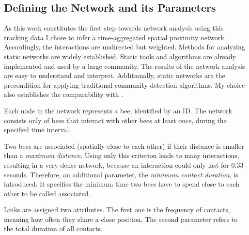 \subsection{Defining the Network and its Parameters}
As this work constitutes the first step towards network analysis using this tracking data I chose to infer a time-aggregated spatial proximity network.
Accordingly, the interactions are undirected but weighted.
Methods for analyzing static networks are widely established.
Static tools and algorithms are already implemented and used by a large community.
The results of the network analysis are easy to understand and interpret.
Additionally, static networks are the precondition for applying traditional community detection algorithms. My choice also establishes the comparability with \textcite{mersch2013tracking}.

Each node in the network represents a bee, identified by an ID.
The network consists only of bees that interact with other bees at least once, during the specified time interval.

Two bees are associated (spatially close to each other) if their distance is smaller than a \emph{maximum distance}.
Using only this criterion leads to many interactions, resulting in a very dense network, because an interaction could only last for 0.33 seconds.
Therefore, an additional parameter, the \emph{minimum contact duration}, is introduced.
It specifies the minimum time two bees have to spend close to each other to be called associated.

Links are assigned two attributes.
The first one is the frequency of contacts, meaning how often they share a close position. The second parameter refers to the total duration of all contacts.


